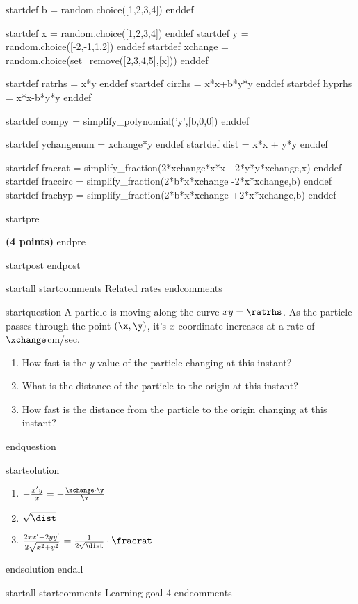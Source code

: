 startdef b = random.choice([1,2,3,4]) enddef

startdef x = random.choice([1,2,3,4]) enddef
startdef y = random.choice([-2,-1,1,2]) enddef
startdef xchange = random.choice(set_remove([2,3,4,5],[x])) enddef

startdef ratrhs = x*y enddef
startdef cirrhs = x*x+b*y*y enddef
startdef hyprhs = x*x-b*y*y enddef

startdef compy = simplify_polynomial('y',[b,0,0]) enddef

startdef ychangenum = xchange*y enddef
startdef dist = x*x + y*y enddef

startdef fracrat = simplify_fraction(2*xchange*x*x - 2*y*y*xchange,x) enddef
startdef fraccirc = simplify_fraction(2*b*x*xchange -2*x*xchange,b) enddef 
startdef frachyp = simplify_fraction(2*b*x*xchange +2*x*xchange,b) enddef 



startpre \item {\bf (4 points)} endpre

startpost
endpost



startall
startcomments 
Related rates
endcomments

startquestion A particle is moving along the curve $xy = \ratrhs$. As the particle passes through the point $(\x,\y)$, it's $x$-coordinate increases at a rate of $\xchange$cm/sec. \begin{enumerate}
\item How fast is the $y$-value of the particle changing at this instant? \vfill \vfill
\item What is the distance of the particle to the origin at this instant? \vfill
\item How fast is the distance from the particle to the origin changing at this instant? \vfill \vfill
\end{enumerate}
endquestion

startsolution
\item \begin{enumerate}
\item $-\frac{x'y}{x} = -\frac{\xchange \cdot \y}{\x}$
\item $\sqrt{\dist}$
\item $\frac{2xx'+2yy'}{2\sqrt{x^2+y^2}} = \frac{1}{2\sqrt{\dist}} \cdot \fracrat$
\end{enumerate}
endsolution
endall




startall
startcomments 
Learning goal 4
endcomments

